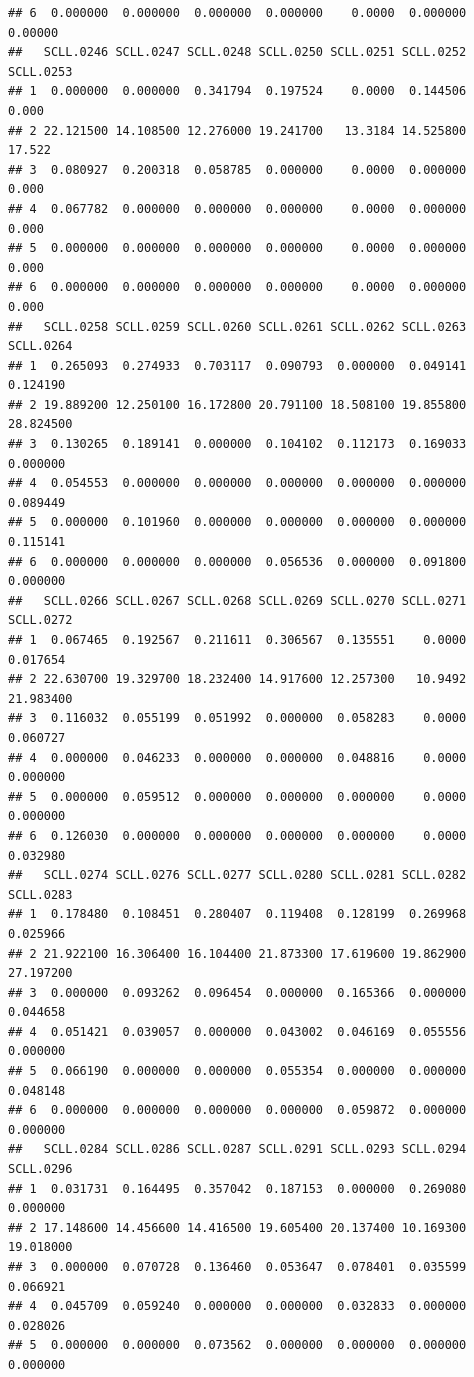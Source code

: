 \documentclass[
]{article}
\begin{document}
\begin{verbatim}
## 6  0.000000  0.000000  0.000000  0.000000    0.0000  0.000000   0.00000
##   SCLL.0246 SCLL.0247 SCLL.0248 SCLL.0250 SCLL.0251 SCLL.0252 SCLL.0253
## 1  0.000000  0.000000  0.341794  0.197524    0.0000  0.144506     0.000
## 2 22.121500 14.108500 12.276000 19.241700   13.3184 14.525800    17.522
## 3  0.080927  0.200318  0.058785  0.000000    0.0000  0.000000     0.000
## 4  0.067782  0.000000  0.000000  0.000000    0.0000  0.000000     0.000
## 5  0.000000  0.000000  0.000000  0.000000    0.0000  0.000000     0.000
## 6  0.000000  0.000000  0.000000  0.000000    0.0000  0.000000     0.000
##   SCLL.0258 SCLL.0259 SCLL.0260 SCLL.0261 SCLL.0262 SCLL.0263 SCLL.0264
## 1  0.265093  0.274933  0.703117  0.090793  0.000000  0.049141  0.124190
## 2 19.889200 12.250100 16.172800 20.791100 18.508100 19.855800 28.824500
## 3  0.130265  0.189141  0.000000  0.104102  0.112173  0.169033  0.000000
## 4  0.054553  0.000000  0.000000  0.000000  0.000000  0.000000  0.089449
## 5  0.000000  0.101960  0.000000  0.000000  0.000000  0.000000  0.115141
## 6  0.000000  0.000000  0.000000  0.056536  0.000000  0.091800  0.000000
##   SCLL.0266 SCLL.0267 SCLL.0268 SCLL.0269 SCLL.0270 SCLL.0271 SCLL.0272
## 1  0.067465  0.192567  0.211611  0.306567  0.135551    0.0000  0.017654
## 2 22.630700 19.329700 18.232400 14.917600 12.257300   10.9492 21.983400
## 3  0.116032  0.055199  0.051992  0.000000  0.058283    0.0000  0.060727
## 4  0.000000  0.046233  0.000000  0.000000  0.048816    0.0000  0.000000
## 5  0.000000  0.059512  0.000000  0.000000  0.000000    0.0000  0.000000
## 6  0.126030  0.000000  0.000000  0.000000  0.000000    0.0000  0.032980
##   SCLL.0274 SCLL.0276 SCLL.0277 SCLL.0280 SCLL.0281 SCLL.0282 SCLL.0283
## 1  0.178480  0.108451  0.280407  0.119408  0.128199  0.269968  0.025966
## 2 21.922100 16.306400 16.104400 21.873300 17.619600 19.862900 27.197200
## 3  0.000000  0.093262  0.096454  0.000000  0.165366  0.000000  0.044658
## 4  0.051421  0.039057  0.000000  0.043002  0.046169  0.055556  0.000000
## 5  0.066190  0.000000  0.000000  0.055354  0.000000  0.000000  0.048148
## 6  0.000000  0.000000  0.000000  0.000000  0.059872  0.000000  0.000000
##   SCLL.0284 SCLL.0286 SCLL.0287 SCLL.0291 SCLL.0293 SCLL.0294 SCLL.0296
## 1  0.031731  0.164495  0.357042  0.187153  0.000000  0.269080  0.000000
## 2 17.148600 14.456600 14.416500 19.605400 20.137400 10.169300 19.018000
## 3  0.000000  0.070728  0.136460  0.053647  0.078401  0.035599  0.066921
## 4  0.045709  0.059240  0.000000  0.000000  0.032833  0.000000  0.028026
## 5  0.000000  0.000000  0.073562  0.000000  0.000000  0.000000  0.000000

\end{verbatim}
\end{document}
